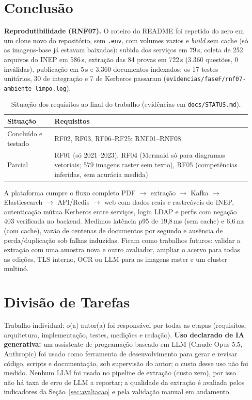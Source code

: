 \documentclass[12pt]{article}
\newcommand{\cod}[1]{\texttt{\small #1}}
\begin{document}
\section{Conclusão}

\textbf{Reprodutibilidade (RNF07).} O roteiro do README foi repetido do zero em um clone novo do repositório,
sem \cod{.env}, com volumes vazios e \textit{build} sem cache (só as imagens-base já estavam baixadas): subida dos
serviços em 79\,s, coleta de 252 arquivos do INEP em 586\,s, extração das 84 provas em 722\,s (3.360 questões,
0 inválidas), publicação em 5\,s e 3.360 documentos indexados; os 17 testes unitários, 30 de integração e 7 de
Kerberos passaram (\cod{evidencias/faseF/rnf07-ambiente-limpo.log}).

\begin{table}[ht]
\centering
\caption{Situação dos requisitos ao final do trabalho (evidências em \cod{docs/STATUS.md}).}\label{tab:status}
\small
\begin{tabularx}{\textwidth}{lX}
\toprule
Situação & Requisitos \\
\midrule
Concluído e testado & RF02, RF03, RF06--RF25; RNF01--RNF08 \\
Parcial & RF01 (só 2021--2023), RF04 (Mermaid só para diagramas vetoriais; 579 imagens raster sem texto), RF05 (competências inferidas, sem acurácia medida) \\
\bottomrule
\end{tabularx}
\end{table}

A plataforma cumpre o fluxo completo PDF $\to$ extração $\to$ Kafka $\to$ Elasticsearch $\to$ API/Redis $\to$
web com dados reais e rastreáveis do INEP, autenticação mútua Kerberos entre serviços, login LDAP e perfis com
negação 403 verificada no backend. Medimos latência p95 de 19,8\,ms (sem cache) e 6,6\,ms (com cache), vazão de
centenas de documentos por segundo e ausência de perda/duplicação sob falhas induzidas. Ficam como trabalhos
futuros: validar a extração com uma amostra nova e outro avaliador, ampliar o acervo para todas as edições, TLS interno,
OCR ou LLM para as imagens raster e um cluster multinó.

\section{Divisão de Tarefas}

Trabalho individual: o(a) autor(a) foi responsável por todas as etapas (requisitos, arquitetura, implementação,
testes, medições e redação). \textbf{Uso declarado de IA generativa:} um assistente de programação baseado em
LLM (Claude Opus 5.5, Anthropic) foi usado como ferramenta de desenvolvimento para gerar e revisar código,
scripts e documentação, sob supervisão do autor; o custo desse uso não foi medido. Nenhum LLM foi usado no
pipeline de extração (custo zero), por isso não há taxa de erro de LLM a reportar; a qualidade da extração é
avaliada pelos indicadores da Seção~\ref{sec:avaliacao} e pela validação manual em andamento.



\end{document}
